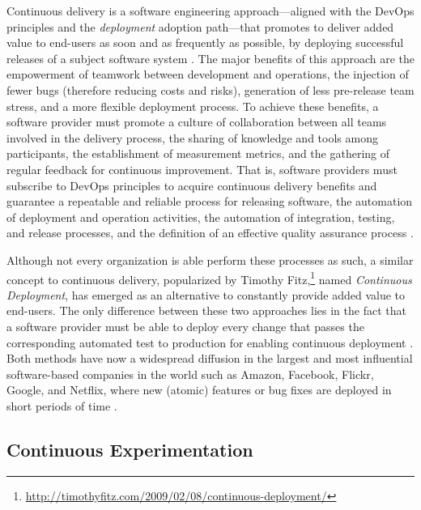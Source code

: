 Continuous delivery is a software engineering approach---aligned with the DevOps principles and the \textit{deployment} adoption path---that promotes to deliver added value to end-users as soon and as frequently as possible, by deploying successful releases of a subject software system \cite{humble-2010-continuous}.
The major benefits of this approach are the empowerment of teamwork between development and operations, the injection of fewer bugs (therefore reducing costs and risks), generation of less pre-release team stress, and a more flexible deployment process. To achieve these benefits, a software provider must promote a culture of collaboration between all teams involved in the delivery process, the sharing of knowledge and tools among participants, the establishment of measurement metrics, and the gathering of regular feedback for continuous improvement. That is, software providers must subscribe to DevOps principles to acquire continuous delivery benefits \cite{humble-2011-enterprises} and guarantee a repeatable and reliable process for releasing software, the automation of deployment and operation activities, %
the automation of integration, testing, and release processes, and the definition of an effective quality assurance process \cite{humble-2010-continuous}.

Although not every organization is able perform these processes as such, a similar concept to continuous delivery, popularized by Timothy Fitz,\footnote{\url{http://timothyfitz.com/2009/02/08/continuous-deployment/}} named \textit{Continuous Deployment}, has emerged as an alternative to constantly provide added value to end-users. The only difference between these two approaches lies in the fact that a software provider must be able to deploy every change that passes the corresponding automated test to production for enabling continuous deployment \cite{humble-2010-continuous}. Both methods have now a widespread diffusion in the largest and most influential software-based companies in the world such as Amazon, Facebook, Flickr, Google, and Netflix, where new (atomic) features or bug fixes are deployed in short periods of time \cite{savor-2016-continuous}.

\subsection{Continuous Experimentation}
\label{subsect:background--continuous-experimentation}

